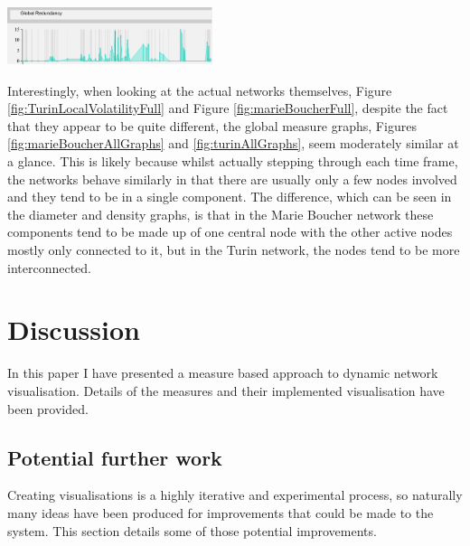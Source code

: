 \begin{multicols}{2}
\begin{center}
\end{center}
\begin{center}
\includegraphics[trim={0 0 0 0}, width=60mm]{./Figures/TurinGlobalRedundancy.png}
\end{center}
\label{fig:turinAllGraphs}
\end{multicols}

Interestingly, when looking at the actual networks themselves, Figure \ref{fig:TurinLocalVolatilityFull} and Figure \ref{fig:marieBoucherFull}, despite the fact that they appear to be quite different, the global measure graphs, Figures \ref{fig:marieBoucherAllGraphs} and \ref{fig:turinAllGraphs}, seem moderately similar at a glance. This is likely because whilst actually stepping through each time frame, the networks behave similarly in that there are usually only a few nodes involved and they tend to be in a single component. The difference, which can be seen in the diameter and density graphs, is that in the Marie Boucher network these components tend to be made up of one central node with the other active nodes mostly only connected to it, but in the Turin network, the nodes tend to be more interconnected.


\chapter{Discussion}

In this paper I have presented a measure based approach to dynamic network visualisation. Details of the measures and their implemented visualisation have been provided.

\section{Potential further work} 
Creating visualisations is a highly iterative and experimental process, so naturally many ideas have been produced for improvements that could be made to the system. This section details some of those potential improvements.
\newline

